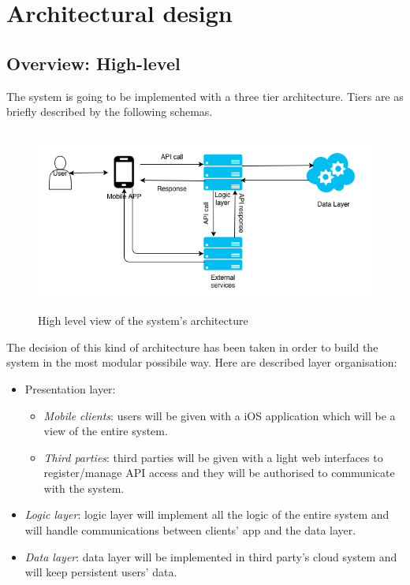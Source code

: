 \documentclass[DD.tex]{subfiles}
\begin{document}
\section{Architectural design}
\subsection{Overview: High-level}

The system is going to be implemented with a three tier architecture. Tiers are  as briefly described by the following schemas.

\begin{figure}[h!]
	\centering
	\includegraphics[height=6.00cm,keepaspectratio]{Figures/GeneralSchema}
	\caption{High level view of the system's architecture}
\end{figure}

The decision of this kind of architecture has been taken in order to build the system in the most modular possibile way. Here are described layer organisation:

\begin{itemize}
	\item Presentation layer:\begin{itemize}
			\item \textit{Mobile clients}: users will be given with a iOS application which will be a view of the entire system.
			\item \textit{Third parties}: third parties will be given with a light web interfaces to register/manage API access and they will be authorised to communicate with the system.
			\end{itemize}
	\item \textit{Logic layer}: logic layer will implement all the logic of the entire system and will handle communications between clients' app and the data layer.
	\item \textit{Data layer}: data layer will be implemented in third party's cloud system and will keep persistent users' data.
\end{itemize}
\end{document}
